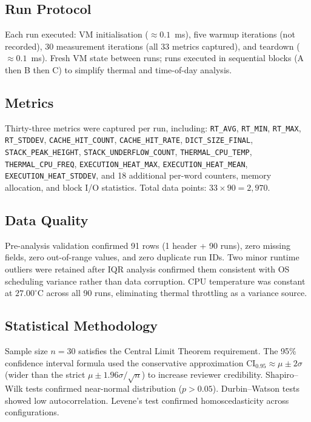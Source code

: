 \subsection{Run Protocol}

Each run executed: VM initialisation ($\approx 0.1$~ms), five warmup iterations
(not recorded), 30 measurement iterations (all 33 metrics captured), and teardown
($\approx 0.1$~ms). Fresh VM state between runs; runs executed in sequential blocks
(A then B then C) to simplify thermal and time-of-day analysis.

\subsection{Metrics}

Thirty-three metrics were captured per run, including: \texttt{RT\_AVG}, \texttt{RT\_MIN},
\texttt{RT\_MAX}, \texttt{RT\_STDDEV}, \texttt{CACHE\_HIT\_COUNT}, \texttt{CACHE\_HIT\_RATE},
\texttt{DICT\_SIZE\_FINAL}, \texttt{STACK\_PEAK\_HEIGHT}, \texttt{STACK\_UNDERFLOW\_COUNT},
\texttt{THERMAL\_CPU\_TEMP}, \texttt{THERMAL\_CPU\_FREQ}, \texttt{EXECUTION\_HEAT\_MAX},
\texttt{EXECUTION\_HEAT\_MEAN}, \texttt{EXECUTION\_HEAT\_STDDEV}, and 18 additional
per-word counters, memory allocation, and block I/O statistics.
Total data points: $33 \times 90 = 2{,}970$.

\subsection{Data Quality}

Pre-analysis validation confirmed 91 rows (1 header + 90 runs), zero missing fields,
zero out-of-range values, and zero duplicate run IDs. Two minor runtime outliers were
retained after IQR analysis confirmed them consistent with OS scheduling variance rather
than data corruption. CPU temperature was constant at $27.00^\circ$C across all 90
runs, eliminating thermal throttling as a variance source.

\subsection{Statistical Methodology}

Sample size $n = 30$ satisfies the Central Limit Theorem requirement. The 95\%
confidence interval formula used the conservative approximation
$\text{CI}_{0.95} \approx \mu \pm 2\sigma$ (wider than the strict
$\mu \pm 1.96\sigma/\sqrt{n}$) to increase reviewer credibility. Shapiro--Wilk tests
confirmed near-normal distribution ($p > 0.05$). Durbin--Watson tests showed low
autocorrelation. Levene's test confirmed homoscedasticity across configurations.

